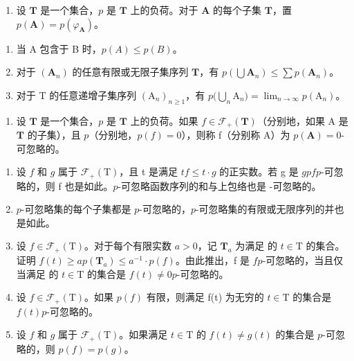 \exercisesection{}

\begin{enumerate}
\def\labelenumi{\arabic{enumi})}
\tightlist
\item
  设 \(\mathbf{T}\) 是一个集合，\(p\) 是 \(\mathbf{T}\) 上的负荷。对于 \(\mathbf{A}\) 的每个子集 \(\mathbf{T}\)，置 \(p(\mathbf{A}) = p(\varphi_{\mathbf{A}})\)。
\end{enumerate}

\begin{enumerate}
\def\labelenumi{\alph{enumi})}
\item
  当 A 包含于 B 时，\(p(A) \leqslant p(B)\)。
\item
  对于 \((\mathbf{A}_n)\) 的任意有限或无限子集序列 \(\mathbf{T}\)，有 \(p(\bigcup \mathbf{A}_n) \leqslant \sum p(\mathbf{A}_n)\)。
\item
  对于 T 的任意递增子集序列 \((\mathrm{A}_n)_{n\geqslant 1}\)，有 \(p\big(\bigcup_{n}\mathrm{A}_{n}\big) = \lim_{n\to \infty}p(\mathrm{A}_n)\)。
\end{enumerate}

\begin{enumerate}
\def\labelenumi{\arabic{enumi})}
\setcounter{enumi}{1}
\tightlist
\item
  设 \(\mathbf{T}\) 是一个集合，\(p\) 是 \(\mathbf{T}\) 上的负荷。如果 \(f \in \mathcal{F}_{+}(\mathbf{T})\)（分别地，如果 A 是 \(\mathbf{T}\) 的子集），且 \(p\)（分别地，\(p(f) = 0\)），则称 f（分别称 A）为 \(p(\mathbf{A}) = 0\)-可忽略的。
\end{enumerate}

\begin{enumerate}
\def\labelenumi{\alph{enumi})}
\item
  设 \(f\) 和 \(g\) 属于 \(\mathcal{F}_{+}(\mathrm{T})\)，且 t 是满足 \(t\)\(f \leqslant t \cdot g\) 的正实数。若 g 是 \(g\)\(p\)\(f\)\(p\)-可忽略的，则 f 也是如此。\(p\)-可忽略函数序列的和与上包络也是 -可忽略的。
\item
  \(p\)-可忽略集的每个子集都是 \(p\)-可忽略的，\(p\)-可忽略集的有限或无限序列的并也是如此。
\item
  设 \(f \in \mathcal{F}_+(\mathrm{T})\)。对于每个有限实数 \(a > 0\)，记 \(\mathbf{T}_a\) 为满足  的 \(t \in \mathrm{T}\) 的集合。证明 \(f(t) \geqslant a\)\(p(\mathbf{T}_a) \leqslant a^{-1} \cdot p(f)\)。由此推出，f 是 \(f\)\(p\)-可忽略的，当且仅当满足  的 \(t \in \mathrm{T}\) 的集合是 \(f(t) \neq 0\)\(p\)-可忽略的。
\item
  设 \(f \in \mathcal{F}_{+}(\mathrm{T})\)。如果 \(p(f)\) 有限，则满足 f(t) 为无穷的 \(t \in \mathrm{T}\) 的集合是 \(f(t)\)\(p\)-可忽略的。
\item
  设 \(f\) 和 \(g\) 属于 \(\mathcal{F}_{+}(\mathrm{T})\)。如果满足 \(t \in \mathrm{T}\) 的 \(f(t) \neq g(t)\) 的集合是 \(p\)-可忽略的，则 \(p(f) = p(g)\)。
\end{enumerate}

